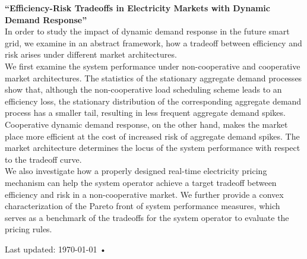 \documentclass[margin,line,11pt]{resume}
\begin{document}
\begin{resume}
\textbf{``Efficiency-Risk Tradeoffs in Electricity Markets with Dynamic Demand Response''}
\\
In order to study the impact of dynamic demand response in the future smart grid, we examine in an
abstract framework, how a tradeoff between efficiency and risk arises under different market
architectures.
\\
We first examine the system performance under non-cooperative and cooperative market architectures.
%
The statistics of the stationary aggregate demand processes show that, although the non-cooperative
load scheduling scheme leads to an efficiency loss, the stationary distribution of the corresponding
aggregate demand process has a smaller tail, resulting in less frequent aggregate demand spikes.
%
{Cooperative dynamic demand response, on the other hand, makes the market place more efficient at
  the cost of increased risk of aggregate demand spikes. The market architecture determines the
  locus of the system performance with respect to the tradeoff curve.}
\\
We also investigate how a properly designed real-time electricity pricing mechanism can help the
system operator achieve a target tradeoff between efficiency and risk in a non-cooperative market.
%
We further provide a convex characterization of the Pareto front of system performance measures,
which serves as a benchmark of the tradeoffs for the system operator to evaluate the pricing rules.


 \begin{center}
   {\scriptsize  Last updated: \today\- •\- }
 \end{center}

\end{resume}
\end{document}
